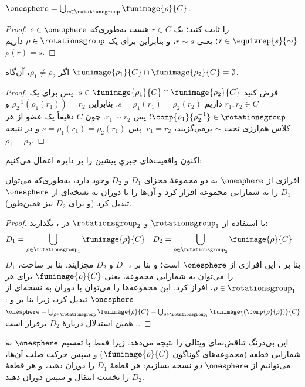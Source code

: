 \documentclass[../../../include/open-logic-section]{subfiles}
\begin{document}
\begin{lem}
$\onesphere = \bigcup_{\rho \in \rotationsgroup} \funimage{\rho}{C}$.
\end{lem}

\begin{proof}
$s \in \onesphere$ را ثابت کنید؛ یک $r \in C$ هست به‌طوری‌که
$r \in \equivrep{s}{\sim}$؛ یعنی $r \sim s$، و بنابراین برای یک
$\rho \in \rotationsgroup$ داریم $\rho(r) = s$.
\end{proof}

\begin{lem}
اگر $\rho_1 \neq \rho_2$، آن‌گاه
$\funimage{\rho_1}{C} \cap \funimage{\rho_2}{C} = \emptyset$.
\end{lem}

\begin{proof}
فرض کنید
$s \in \funimage{\rho_{1}}{C} \cap \funimage{\rho_{2}}{C}$. پس برای
یک $r_{1}, r_{2} \in C$ داریم
$s = \rho_{1}(r_{1}) = \rho_{2}(r_{2})$. بنابراین
$\rho^{-1}_2(\rho_1(r_1)) = r_2$ و
$\comp{\rho_1}{\rho^{-1}_2} \in \rotationsgroup$؛ پس
$r_{1} \sim r_{2}$. چون $C$ دقیقاً یک عضو از هر کلاس هم‌ارزی تحت
$\sim$ برمی‌گزیند، $r_1 = r_2$. پس
$s = \rho_1(r_1) = \rho_2(r_1)$ و در نتیجه
$\rho_1 = \rho_2$.
\end{proof}

اکنون واقعیت‌های جبریِ پیشین را بر دایره اعمال می‌کنیم:

\begin{lem}
افرازی از $\onesphere$ به دو مجموعهٔ مجزای $D_{1}$ و $D_{2}$ وجود
دارد، به‌طوری‌که می‌توان $D_{1}$ را به شمارایی مجموعه افراز کرد و
آن‌ها را با دوران به نسخه‌ای از $\onesphere$ تبدیل کرد (و برای
$D_{2}$ نیز همین‌طور).
\end{lem}

\begin{proof}
با استفاده از $\rotationsgroup_{1}$ و $\rotationsgroup_{2}$ در
، بگذارید:
\begin{align*}
	D_{1} &= \bigcup_{\rho \in \rotationsgroup_1} \funimage{\rho}{C} &
	D_{2} &= \bigcup_{\rho \in \rotationsgroup_2} \funimage{\rho}{C}
\end{align*}
بنا بر ، این افرازی از $\onesphere$ است؛ و بنا
بر ، $D_1$ و $D_2$ مجزایند. بنا بر ساخت،
$D_1$ را می‌توان به شمارایی مجموعه، یعنی
$\funimage{\rho}{C}$ برای هر
$\rho \in \rotationsgroup_1$، افراز کرد. این مجموعه‌ها را می‌توان
با دوران به نسخه‌ای از $\onesphere$ تبدیل کرد، زیرا بنا بر
 و :
$\onesphere = \bigcup_{\rho \in
\rotationsgroup}\funimage{\rho}{C} = \bigcup_{\rho \in
\rotationsgroup_1}\funimage{(\comp{\rho}{\rho})}{C}$.
همین استدلال دربارهٔ $D_2$ برقرار است.
\end{proof}\noindent
این بی‌درنگ تناقض‌نمای ویتالی را نتیجه می‌دهد. زیرا فقط با تقسیم
$\onesphere$ به شمارایی قطعه (مجموعه‌های گوناگون
$\funimage{\rho}{C}$) و سپس حرکت صلب آن‌ها، می‌توانیم از
$\onesphere$ \emph{دو} نسخه بسازیم: هر قطعهٔ $D_1$ را دوران دهید،
و هر قطعهٔ $D_2$ را نخست انتقال و سپس دوران دهید.
\end{document}
